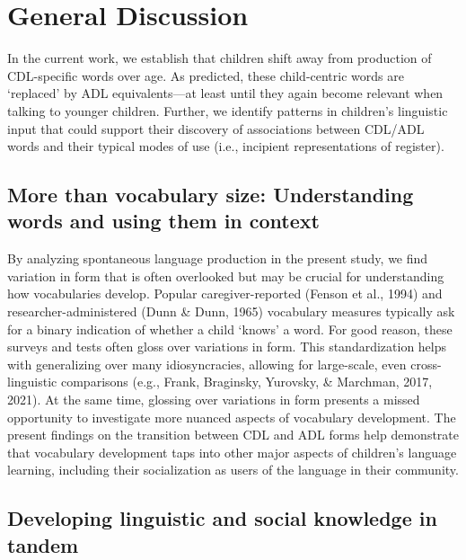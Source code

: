 \documentclass[10pt, letterpaper]{article}
\begin{document}
\hypertarget{general-discussion}{%
\section{General Discussion}\label{general-discussion}}

In the current work, we establish that children shift away from
production of CDL-specific words over age. As predicted, these
child-centric words are `replaced' by ADL equivalents---at least until
they again become relevant when talking to younger children. Further, we
identify patterns in children's linguistic input that could support
their discovery of associations between CDL/ADL words and their typical
modes of use (i.e., incipient representations of register).

\hypertarget{more-than-vocabulary-size-understanding-words-and-using-them-in-context}{%
\subsection{More than vocabulary size: Understanding words and using
them in
context}\label{more-than-vocabulary-size-understanding-words-and-using-them-in-context}}

By analyzing spontaneous language production in the present study, we
find variation in form that is often overlooked but may be crucial for
understanding how vocabularies develop. Popular caregiver-reported
(Fenson et al., 1994) and researcher-administered (Dunn \& Dunn, 1965)
vocabulary measures typically ask for a binary indication of whether a
child `knows' a word. For good reason, these surveys and tests often
gloss over variations in form. This standardization helps with
generalizing over many idiosyncracies, allowing for large-scale, even
cross-linguistic comparisons (e.g., Frank, Braginsky, Yurovsky, \&
Marchman, 2017, 2021). At the same time, glossing over variations in
form presents a missed opportunity to investigate more nuanced aspects
of vocabulary development. The present findings on the transition
between CDL and ADL forms help demonstrate that vocabulary development
taps into other major aspects of children's language learning, including
their socialization as users of the language in their community.

\hypertarget{developing-linguistic-and-social-knowledge-in-tandem}{%
\subsection{Developing linguistic and social knowledge in
tandem}\label{developing-linguistic-and-social-knowledge-in-tandem}}
\end{document}
